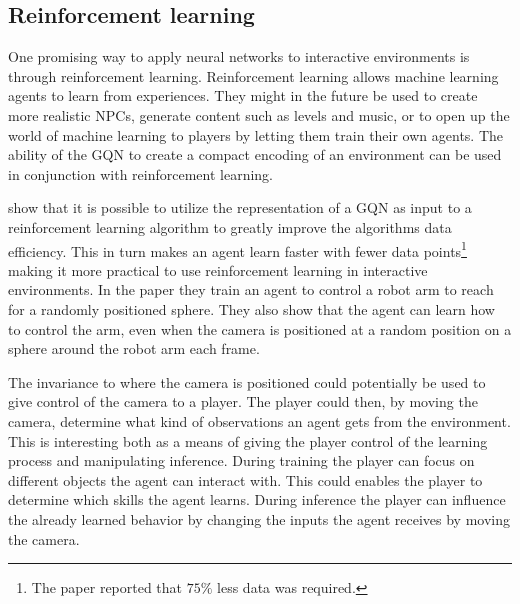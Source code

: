 \subsection{Reinforcement learning}
One promising way to apply neural networks to interactive environments is through reinforcement learning. Reinforcement learning allows machine learning agents to learn from experiences. They might in the future be used to create more realistic NPCs, generate content such as levels and music, or to open up the world of machine learning to players by letting them train their own agents. The ability of the GQN to create a compact encoding of an environment can be used in conjunction with reinforcement learning.

\cite{gqn} show that it is possible to utilize the representation of a GQN as input to a reinforcement learning algorithm to greatly improve the algorithms data efficiency. This in turn makes an agent learn faster with fewer data points\footnote{The paper reported that $75\%$ less data was required.} making it more practical to use reinforcement learning in interactive environments. In the paper they train an agent to control a robot arm to reach for a randomly positioned sphere. They also show that the agent can learn how to control the arm, even when the camera is positioned at a random position on a sphere around the robot arm each frame.

The invariance to where the camera is positioned could potentially be used to give control of the camera to a player. The player could then, by moving the camera, determine what kind of observations an agent gets from the environment. This is interesting both as a means of giving the player control of the learning process and manipulating inference. During training the player can focus on different objects the agent can interact with. This could enables the player to determine which skills the agent learns. During inference the player can influence the already learned behavior by changing the inputs the agent receives by moving the camera.


%
%


